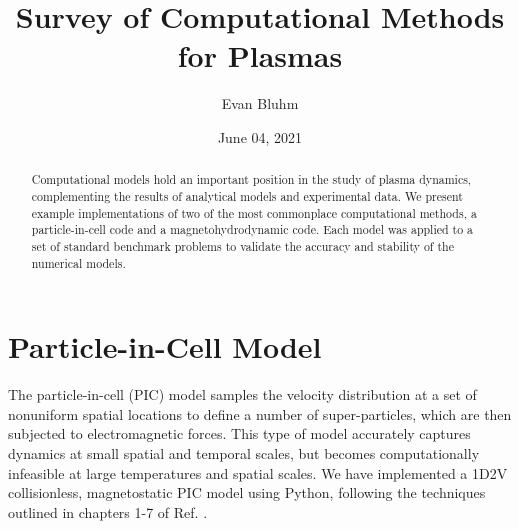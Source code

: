 \documentclass[%
 reprint,
 amsmath,amssymb,
 aps,
]{revtex4-2}
\begin{document}

\title{Survey of Computational Methods for Plasmas}%

\author{Evan Bluhm}


\date{June 04, 2021}%
\begin{abstract}

Computational models hold an important position in the study of plasma dynamics, complementing the results of analytical models and experimental data. We present example implementations of two of the most commonplace computational methods, a particle-in-cell code and a magnetohydrodynamic code. Each model was applied to a set of standard benchmark problems to validate the accuracy and stability of the numerical models.
\end{abstract}

\maketitle

\section{Particle-in-Cell Model}
The particle-in-cell (PIC) model samples the velocity distribution at a set of nonuniform spatial locations to define a number of super-particles, which are then subjected to electromagnetic forces. This type of model accurately captures dynamics at small spatial and temporal scales, but becomes computationally infeasible at large temperatures and spatial scales. We have implemented a 1D2V collisionless, magnetostatic PIC model using Python, following the techniques outlined in chapters 1-7 of Ref. \cite{BirdsallCharlesK1991Ppvc}.
\end{document}
